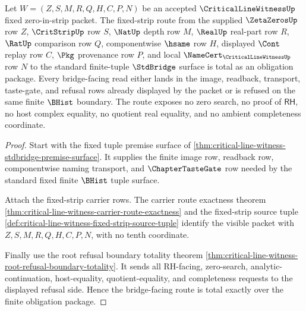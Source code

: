 \begin{theorem}
\label{thm:critical-line-witness-fixed-strip-stdbridge-route-totality}
Let $W=(Z,S,M,R,Q,H,C,P,N)$ be an accepted $\CriticalLineWitnessUp$ fixed zero-in-strip packet. The fixed-strip route from the supplied $\ZetaZerosUp$ row $Z$, $\CritStripUp$ row $S$, $\NatUp$ depth row $M$, $\RealUp$ real-part row $R$, $\RatUp$ comparison row $Q$, componentwise $\hsame$ row $H$, displayed $\Cont$ replay row $C$, $\Pkg$ provenance row $P$, and local $\NameCert_{\CriticalLineWitnessUp}$ row $N$ to the standard finite-tuple $\StdBridge$ surface is total as an obligation package. Every bridge-facing read either lands in the image, readback, transport, taste-gate, and refusal rows already displayed by the packet or is refused on the same finite $\BHist$ boundary. The route exposes no zero search, no proof of $\mathsf{RH}$, no host complex equality, no quotient real equality, and no ambient completeness coordinate.
\end{theorem}
\begin{proof}
Start with the fixed tuple premise surface of \autoref{thm:critical-line-witness-stdbridge-premise-surface}. It supplies the finite image row, readback row, componentwise naming transport, and $\ChapterTasteGate$ row needed by the standard fixed finite $\BHist$ tuple surface.

Attach the fixed-strip carrier rows. The carrier route exactness theorem \autoref{thm:critical-line-witness-carrier-route-exactness} and the fixed-strip source tuple \autoref{def:critical-line-witness-fixed-strip-source-tuple} identify the visible packet with $Z,S,M,R,Q,H,C,P,N$, with no tenth coordinate.

Finally use the root refusal boundary totality theorem \autoref{thm:critical-line-witness-root-refusal-boundary-totality}. It sends all RH-facing, zero-search, analytic-continuation, host-equality, quotient-equality, and completeness requests to the displayed refusal side. Hence the bridge-facing route is total exactly over the finite obligation package.
\end{proof}

